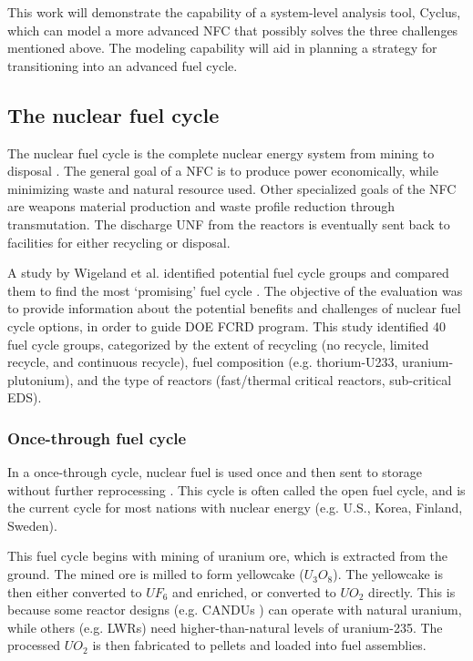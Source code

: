 This work will demonstrate the capability of a system-level
analysis tool, Cyclus, which can model a more advanced \gls{NFC} that
possibly solves the three challenges mentioned above. 
The modeling capability will aid in planning a strategy for
transitioning into an advanced fuel cycle.

\subsection{The nuclear fuel cycle}
The nuclear fuel cycle is the complete nuclear energy
system from mining to disposal \cite{tsoulfanidis_nuclear_2013}.
The general goal of
a \gls{NFC} is to produce power economically, while minimizing
waste and natural resource used. Other specialized goals of the \gls{NFC} are
weapons material production and waste profile reduction through transmutation.
The discharge \gls{UNF} from the reactors is eventually sent back to facilities for
either recycling or disposal.

A study by Wigeland et al. identified potential fuel cycle groups and compared them
to find the most `promising' fuel cycle \cite{wigeland_nuclear_2014}.
The objective of the evaluation was to provide information about the
potential benefits and challenges of nuclear fuel cycle options, in order to
guide \gls{DOE} \gls{FCRD} program.
This study identified 40 fuel cycle groups, categorized by the extent of recycling
(no recycle, limited recycle, and continuous recycle), fuel composition
(e.g. thorium-U233, uranium-plutonium), and the type of reactors (fast/thermal critical
reactors, sub-critical \gls{EDS}).

\subsubsection{Once-through fuel cycle}

In a once-through cycle, nuclear fuel is used once and then sent to
storage without further reprocessing \cite{tsoulfanidis_nuclear_2013}.
This cycle is often called the open fuel cycle, and is the current cycle for
most nations with nuclear energy (e.g. U.S., Korea, Finland, Sweden).

This fuel cycle begins with mining of uranium ore, which is extracted from the
ground. The mined ore is milled to form yellowcake ($U_3O_8$).
The yellowcake is then either converted to $UF_6$ and enriched, or converted
to $UO_2$ directly. This is because some reactor designs (e.g. \glspl{CANDU} \cite{torgerson_candu_2006})
can operate with natural uranium, while others (e.g. \glspl{LWR}) need
higher-than-natural levels of uranium-235. The processed $UO_2$ is
then fabricated to pellets and loaded into fuel assemblies.

